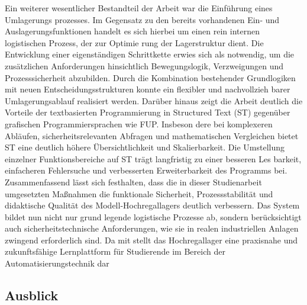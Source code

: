Ein weiterer wesentlicher Bestandteil der Arbeit war die Einführung eines Umlagerungs
prozesses. Im Gegensatz zu den bereits vorhandenen Ein- und Auslagerungsfunktionen
handelt es sich hierbei um einen rein internen logistischen Prozess, der zur Optimie
rung der Lagerstruktur dient. Die Entwicklung einer eigenständigen Schrittkette erwies
sich als notwendig, um die zusätzlichen Anforderungen hinsichtlich Bewegungslogik,
Verzweigungen und Prozesssicherheit abzubilden. Durch die Kombination bestehender
Grundlogiken mit neuen Entscheidungsstrukturen konnte ein flexibler und nachvollzieh
barer Umlagerungsablauf realisiert werden.
Darüber hinaus zeigt die Arbeit deutlich die Vorteile der textbasierten Programmierung
in Structured Text (ST) gegenüber grafischen Programmiersprachen wie FUP. Insbeson
dere bei komplexeren Abläufen, sicherheitsrelevanten Abfragen und mathematischen
Vergleichen bietet ST eine deutlich höhere Übersichtlichkeit und Skalierbarkeit. Die
Umstellung einzelner Funktionsbereiche auf ST trägt langfristig zu einer besseren Les
barkeit, einfacheren Fehlersuche und verbesserten Erweiterbarkeit des Programms
bei.
Zusammenfassend lässt sich festhalten, dass die in dieser Studienarbeit umgesetzten
Maßnahmen die funktionale Sicherheit, Prozessstabilität und didaktische Qualität des
Modell-Hochregallagers deutlich verbessern. Das System bildet nun nicht nur grund
legende logistische Prozesse ab, sondern berücksichtigt auch sicherheitstechnische
Anforderungen, wie sie in realen industriellen Anlagen zwingend erforderlich sind. Da
mit stellt das Hochregallager eine praxisnahe und zukunftsfähige Lernplattform für
Studierende im Bereich der Automatisierungstechnik dar

\subsection{Ausblick}

